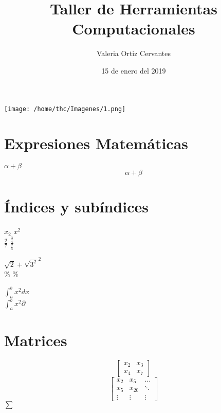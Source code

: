 \documentclass{article}
\title{\Huge Taller de Herramientas Computacionales}
\author{Valeria Ortiz Cervantes}
\date{15 de enero del 2019}
\begin{document}
	\maketitle
\begin{center}
	\texttt{[image: /home/thc/Imagenes/1.png]}
\end{center}
\newpage
\section*{Expresiones Matemáticas}
$\alpha +  \beta$\\ %
\[\alpha + \beta\] %
\section*{Índices y subíndices}
$x_{2}$ %
$x^{2}$ \\ %

$\frac{2}{7}$ %
$\frac{\frac{3}{4}}{\frac{2}{5}}$

$\sqrt{2} + \sqrt{3^2}^2$ \\
\%   $\%$

$\int_{a}^{b} x^2 dx$ \\ 
$\int_{a}^{b} x^2 \partial$
\section*{Matrices}
\[
\begin{bmatrix}
	x_{2} & x_{3}\\
	x_{4} & x_{7}
\end{bmatrix}
\]
\[ %
\begin{bmatrix}
x_{2} & x_{5} & \dots\\
x_{5} & x_{20} & \ddots\\
\vdots & \vdots & \vdots
\end{bmatrix}
\]
$\sum$
\end{document}

